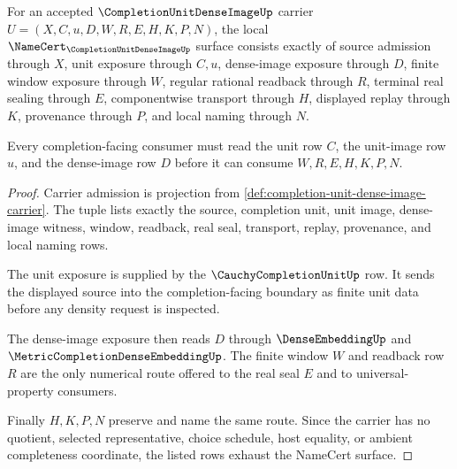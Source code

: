 \begin{theorem}
\label{thm:completion-unit-dense-image-namecert-obligations}
For an accepted $\CompletionUnitDenseImageUp$ carrier $U=(X,C,u,D,W,R,E,H,K,P,N)$, the local $\NameCert_{\CompletionUnitDenseImageUp}$ surface consists exactly of source admission through $X$, unit exposure through $C,u$, dense-image exposure through $D$, finite window exposure through $W$, regular rational readback through $R$, terminal real sealing through $E$, componentwise transport through $H$, displayed replay through $K$, provenance through $P$, and local naming through $N$.

Every completion-facing consumer must read the unit row $C$, the unit-image row $u$, and the dense-image row $D$ before it can consume $W,R,E,H,K,P,N$.
\end{theorem}
\begin{proof}
Carrier admission is projection from \autoref{def:completion-unit-dense-image-carrier}. The tuple lists exactly the source, completion unit, unit image, dense-image witness, window, readback, real seal, transport, replay, provenance, and local naming rows.

The unit exposure is supplied by the $\CauchyCompletionUnitUp$ row. It sends the displayed source into the completion-facing boundary as finite unit data before any density request is inspected.

The dense-image exposure then reads $D$ through $\DenseEmbeddingUp$ and $\MetricCompletionDenseEmbeddingUp$. The finite window $W$ and readback row $R$ are the only numerical route offered to the real seal $E$ and to universal-property consumers.

Finally $H,K,P,N$ preserve and name the same route. Since the carrier has no quotient, selected representative, choice schedule, host equality, or ambient completeness coordinate, the listed rows exhaust the NameCert surface.
\end{proof}

